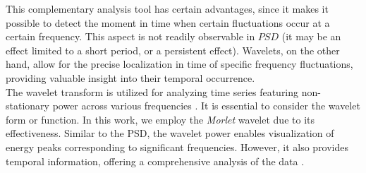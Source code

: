 \documentclass[12pt]{article}
\begin{document}
This complementary analysis tool has certain advantages, since it makes it possible to detect the moment in time when certain fluctuations occur at a certain frequency. This aspect is not readily observable in $PSD$ (it may be an effect limited to a short period, or a persistent effect). Wavelets, on the other hand, allow for the precise localization in time of specific frequency fluctuations, providing valuable insight into their temporal occurrence.\\

The wavelet transform is utilized for analyzing time series featuring non-stationary power across various frequencies \citep{guide_wavelet_routines}. It is essential to consider the wavelet form or function. In this work, we employ the \emph{Morlet} wavelet due to its effectiveness. Similar to the PSD, the wavelet power enables visualization of energy peaks corresponding to significant frequencies. However, it also provides temporal information, offering a comprehensive analysis of the data \cite{book_analysis_Method_multiSp_data, guide_wavelet_routines}.
\end{document}
